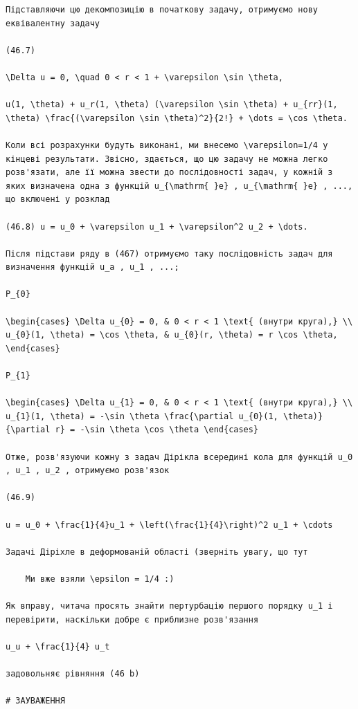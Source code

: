 \documentclass[
  ukrainian,
]{article}
\begin{document}
\begin{verbatim}
Підставляючи цю декомпозицію в початкову задачу, отримуємо нову еквівалентну задачу

(46.7)

\Delta u = 0, \quad 0 < r < 1 + \varepsilon \sin \theta,

u(1, \theta) + u_r(1, \theta) (\varepsilon \sin \theta) + u_{rr}(1, \theta) \frac{(\varepsilon \sin \theta)^2}{2!} + \dots = \cos \theta.

Коли всі розрахунки будуть виконані, ми внесемо \varepsilon=1/4 у кінцеві результати. Звісно, здається, що цю задачу не можна легко розв'язати, але її можна звести до послідовності задач, у кожній з яких визначена одна з функцій u_{\mathrm{ }e} , u_{\mathrm{ }e} , ..., що включені у розклад

(46.8) u = u_0 + \varepsilon u_1 + \varepsilon^2 u_2 + \dots.

Після підстави ряду в (467) отримуємо таку послідовність задач для визначення функцій u_a , u_1 , ...;

P_{0}

\begin{cases} \Delta u_{0} = 0, & 0 < r < 1 \text{ (внутри круга),} \\ u_{0}(1, \theta) = \cos \theta, & u_{0}(r, \theta) = r \cos \theta, \end{cases}

P_{1}

\begin{cases} \Delta u_{1} = 0, & 0 < r < 1 \text{ (внутри круга),} \\ u_{1}(1, \theta) = -\sin \theta \frac{\partial u_{0}(1, \theta)}{\partial r} = -\sin \theta \cos \theta \end{cases}

Отже, розв'язуючи кожну з задач Дірікла всередині кола для функцій u_0 , u_1 , u_2 , отримуємо розв'язок

(46.9)

u = u_0 + \frac{1}{4}u_1 + \left(\frac{1}{4}\right)^2 u_1 + \cdots

Задачі Діріхле в деформованій області (зверніть увагу, що тут

    Ми вже взяли \epsilon = 1/4 :)

Як вправу, читача просять знайти пертурбацію першого порядку u_1 і перевірити, наскільки добре є приблизне розв'язання

u_u + \frac{1}{4} u_t

задовольняє рівняння (46 b)

# ЗАУВАЖЕННЯ


\end{verbatim}
\end{document}
